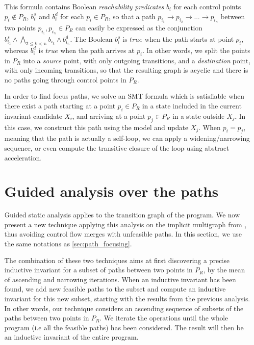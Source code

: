 \documentclass[preprint]{sigplanconf}
\begin{document}
This formula contains Boolean \emph{reachability predicates} $b_i$ for each
control points $p_i \notin P_R$, $b_i^s$ and $b_i^d$ for each $p_i \in P_R$, so
that a path 
$p_{i_1} \rightarrow p_{i_2} \rightarrow \dots \rightarrow p_{i_n}$ 
between two points $p_{i_1}, p_{i_n} \in P_R$ 
can easily be expressed as the
conjunction $b_{i_1}^s \wedge \bigwedge_{2 \leq k < n} b_{i_k} \wedge b_{i_n}^d$.
The Boolean $b_{i}^s$ is $true$ when the path starts at point $p_i$, whereas
$b_i^d$ is $true$ when the path arrives at $p_i$. In other words, we split the
points in $P_R$ into a \emph{source} point, with only outgoing transitions, and
a \emph{destination} point, with only incoming transitions, so that the
resulting graph is acyclic and there is no paths going through control
points in $P_R$.

In order to find focus paths, we solve an SMT formula which is satisfiable when
there exist a path starting at a point $p_i \in P_R$ in a state included in the
current invariant candidate $X_i$, and arriving at a point $p_j \in P_R$ in a
state outside $X_j$. In this case, we construct this path using the model and
update $X_j$. When $p_i = p_j$, meaning that the path is actually a self-loop,
we can apply a widening/narrowing sequence, or even compute the transitive
closure of the loop using abstract acceleration. %

\section{Guided analysis over the paths}
\label{sec:guided_multigraph}

Guided static analysis \cite{DBLP:conf/sas/GopanR07} applies to the transition
graph of the program. We now present a new technique applying this analysis on the implicit
multigraph from \cite{Monniaux_Gonnord_SAS11}, thus avoiding control flow merges with
unfeasible paths.
In this section, we use the same notations as \ref{sec:path_focusing}.

The combination of these two techniques aims at first discovering a precise
inductive invariant for a subset of paths between two points in $P_R$, 
by the mean of ascending and narrowing iterations. When an
inductive invariant has been found, we add new feasible paths to the subset and
compute an inductive invariant for this new subset, starting with the results
from the previous analysis.
In other words, our technique considers an ascending sequence of
subsets of the paths between two points in $P_R$.
We iterate the operations until the whole program (i.e all the
feasible paths) has been considered. The result will then be an
inductive invariant of the entire program.
\end{document}
